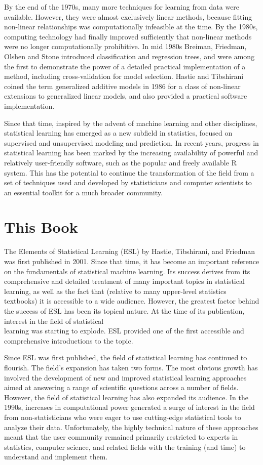 \documentclass[10pt]{article}
\begin{document}
By the end of the 1970s, many more techniques for learning from data were available. However, they were almost exclusively linear methods, because fitting non-linear relationships was computationally infeasible at the time. By the 1980s, computing technology had finally improved sufficiently that non-linear methods were no longer computationally prohibitive. In mid 1980s Breiman, Friedman, Olshen and Stone introduced classification and regression trees, and were among the first to demonstrate the power of a detailed practical implementation of a method, including cross-validation for model selection. Hastie and Tibshirani coined the term generalized additive models in 1986 for a class of non-linear extensions to generalized linear models, and also provided a practical software implementation.

Since that time, inspired by the advent of machine learning and other disciplines, statistical learning has emerged as a new subfield in statistics, focused on supervised and unsupervised modeling and prediction. In recent years, progress in statistical learning has been marked by the increasing availability of powerful and relatively user-friendly software, such as the popular and freely available R system. This has the potential to continue the transformation of the field from a set of techniques used and developed by statisticians and computer scientists to an essential toolkit for a much broader community.

\section*{This Book}
The Elements of Statistical Learning (ESL) by Hastie, Tibshirani, and Friedman was first published in 2001. Since that time, it has become an important reference on the fundamentals of statistical machine learning. Its success derives from its comprehensive and detailed treatment of many important topics in statistical learning, as well as the fact that (relative to many upper-level statistics textbooks) it is accessible to a wide audience. However, the greatest factor behind the success of ESL has been its topical nature. At the time of its publication, interest in the field of statistical\\
learning was starting to explode. ESL provided one of the first accessible and comprehensive introductions to the topic.

Since ESL was first published, the field of statistical learning has continued to flourish. The field's expansion has taken two forms. The most obvious growth has involved the development of new and improved statistical learning approaches aimed at answering a range of scientific questions across a number of fields. However, the field of statistical learning has also expanded its audience. In the 1990s, increases in computational power generated a surge of interest in the field from non-statisticians who were eager to use cutting-edge statistical tools to analyze their data. Unfortunately, the highly technical nature of these approaches meant that the user community remained primarily restricted to experts in statistics, computer science, and related fields with the training (and time) to understand and implement them.
\end{document}
